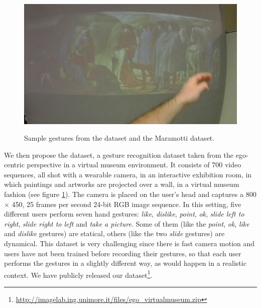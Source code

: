 \begin{figure}
{\includegraphics[width=0.2\linewidth]{Figures/slide_2_2030_2058_all23.jpg}
}\\
\caption{Sample gestures from the \datasetunimore{} dataset and the Maramotti dataset.}
\label{example-unimore}
\end{figure}

We then propose the \datasetunimore{} dataset, a gesture recognition dataset taken from the ego-centric perspective in a virtual museum environment. It consists of 700 video sequences, all shot with a wearable camera, in an interactive exhibition room, in which paintings and artworks are projected over a wall, in a virtual museum fashion (see figure \ref{example-unimore}). The camera is placed on the user's head and captures a 800 $\times$ 450, 25 frames per second 24-bit RGB image sequence. In this setting, five different users perform seven hand gestures: \textit{like}, \textit{dislike}, \textit{point}, \textit{ok}, \textit{slide left to right}, \textit{slide right to left} and \textit{take a picture}. Some of them (like the \textit{point}, \textit{ok}, \textit{like} and \textit{dislike} gestures) are statical, others (like the two \textit{slide} gestures) are dynamical. 
This dataset is very challenging since there is fast camera motion and users have not been trained before recording their gestures, so that each user performs the gestures in a slightly different way, as would happen in a realistic context. We have publicly released our dataset\footnote{\url{http://imagelab.ing.unimore.it/files/ego_virtualmuseum.zip}}.

